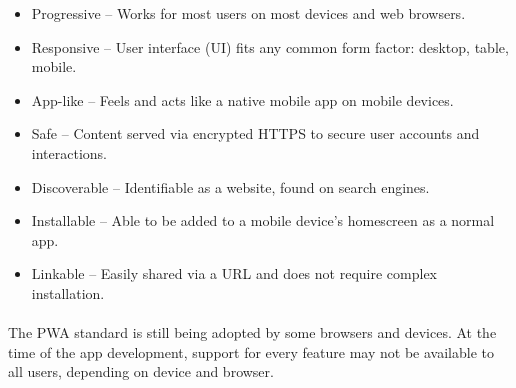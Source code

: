    \begin{itemize}[label={\checkmark}]
       \item Progressive  -- Works for most users on most devices and web browsers.
      \item Responsive   -- User interface (UI) fits any common form factor: desktop, table, mobile.
     \item App-like     -- Feels and acts like a native mobile app on mobile devices.
        \item Safe         -- Content served via encrypted HTTPS to secure user accounts and interactions.
        \item Discoverable -- Identifiable as a website, found on search engines.
        \item Installable  -- Able to be added to a mobile device's homescreen as a normal app.
        \item Linkable     -- Easily shared via a URL and does not require complex installation.
    \end{itemize}

\paragraph{}

    The PWA standard is still being adopted by some browsers and devices. At the time of the \appname app development, support for every feature may not be available to all users, depending on device and browser.
